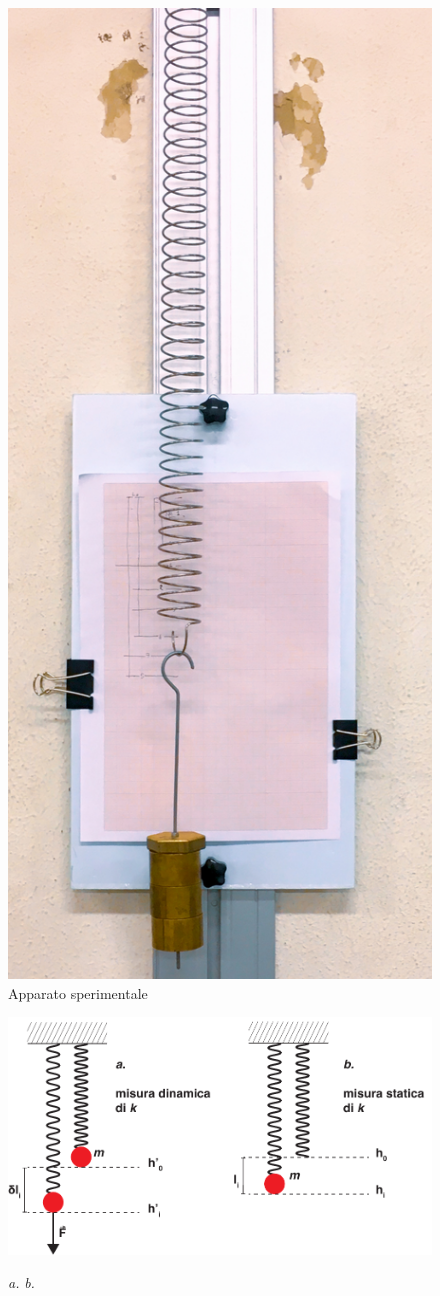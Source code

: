\documentclass[italian, a4paper, 10pt, twocolumn]{../../style/lab_unige}
\begin{document}
    \begin{figure}
        \centering
        \includegraphics[width=0.8\linewidth]{IMG_0242.JPG}
        \caption{Apparato sperimentale}
        \label{figure:apparatus}
    \end{figure}

    \begin{figure}[t]
        \centering
        \includegraphics[width=0.8\linewidth]{system_horiz.pdf}
        \label{figure:methods}
        \caption{\textit{a.} \textit{b.}}
    \end{figure}
\end{document}
